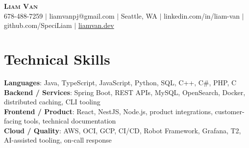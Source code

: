 \documentclass[letterpaper,11pt]{article}
\begin{document}

%
\begin{center}
    \textbf{\Huge \scshape Liam Van} \\ \vspace{1pt}
    \small 678-488-7259 $|$ \small {liamvanpj@gmail.com} $|$ Seattle, WA
 {{$|$ linkedin.com/in/liam-van} {$|$ github.com/SpeciLiam} {$|$ \href{https://liamvan.dev}{liamvan.dev}}}

\end{center}

\section{Technical Skills}
 \begin{itemize}[leftmargin=0.15in, label={}]
    \small{\item{
     \textbf{Languages}{: Java, TypeScript, JavaScript, Python, SQL, C++, C\#, PHP, C} \\
     \textbf{Backend / Services}{: Spring Boot, REST APIs, MySQL, OpenSearch, Docker, distributed caching, CLI tooling} \\
     \textbf{Frontend / Product}{: React, NestJS, Node.js, product integrations, customer-facing tools, technical documentation} \\
     \textbf{Cloud / Quality}{: AWS, OCI, GCP, CI/CD, Robot Framework, Grafana, T2, AI-assisted tooling, on-call response} \\
    }}
 \end{itemize}
%

\end{document}
